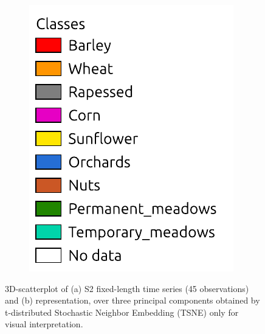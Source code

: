 \documentclass[journal,article,submit,pdftex,moreauthors]{Definitions/mdpi}
\begin{document}
\begin{figure}[H]
\begin{subfigure}[t]{0.35\linewidth}
	\caption{}
	\label{fig:pca_rep}
	\end{subfigure}
     \begin{subfigure}[t]{0.15\linewidth}
        \includegraphics[width=\textwidth]{figures/aes_1_layer_mse_results/labels.pdf}
    \end{subfigure}
	\caption{3D-scatterplot of (a) S2 fixed-length time series (45 observations) and (b) representation, over three principal components obtained by t-distributed Stochastic Neighbor Embedding (TSNE) only for visual interpretation.}
	\label{fcn_losses}
\end{figure}
\end{document}
